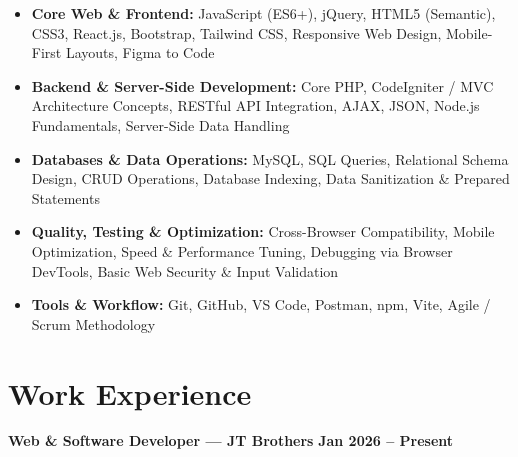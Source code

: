 \documentclass[a4paper,10pt]{article}
\begin{document}
\begin{itemize}

    \item \textbf{Core Web \& Frontend:}
    JavaScript (ES6+), jQuery, HTML5 (Semantic), CSS3, React.js,
    Bootstrap, Tailwind CSS, Responsive Web Design, Mobile-First Layouts,
    Figma to Code

    \item \textbf{Backend \& Server-Side Development:}
    Core PHP, CodeIgniter / MVC Architecture Concepts, RESTful API Integration,
    AJAX, JSON, Node.js Fundamentals, Server-Side Data Handling

    \item \textbf{Databases \& Data Operations:}
    MySQL, SQL Queries, Relational Schema Design, CRUD Operations,
    Database Indexing, Data Sanitization \& Prepared Statements

    \item \textbf{Quality, Testing \& Optimization:}
    Cross-Browser Compatibility, Mobile Optimization, Speed \& Performance Tuning,
    Debugging via Browser DevTools, Basic Web Security \& Input Validation

    \item \textbf{Tools \& Workflow:}
    Git, GitHub, VS Code, Postman, npm, Vite, Agile / Scrum Methodology

\end{itemize}

\section*{Work Experience}

\textbf{Web \& Software Developer --- JT Brothers}
\hfill
\textbf{Jan 2026 -- Present}
\end{document}
